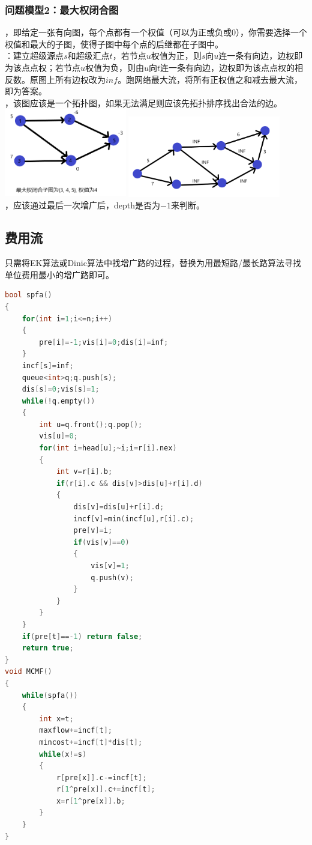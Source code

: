 \documentclass[a4paper]{book}
\begin{document}
\subsubsection{问题模型2：最大权闭合图}
，即给定一张有向图，每个点都有一个权值（可以为正或负或$0$），你需要选择一个权值和最大的子图，使得子图中每个点的后继都在子图中。\\
：建立超级源点$s$和超级汇点$t$，若节点$u$权值为正，则$s$向$u$连一条有向边，边权即为该点点权；若节点$u$权值为负，则由$u$向$t$连一条有向边，边权即为该点点权的相反数。原图上所有边权改为$inf$。跑网络最大流，将所有正权值之和减去最大流，即为答案。\\
，该图应该是一个拓扑图，如果无法满足则应该先拓扑排序找出合法的边。\\
\includegraphics[width=0.4\textwidth,center]{../photo/zxg1}
\includegraphics[width=0.5\textwidth,center]{../photo/zxg2}\\
，应该通过最后一次增广后，depth是否为$-1$来判断。
\subsection{费用流}
只需将EK算法或Dinic算法中找增广路的过程，替换为用最短路/最长路算法寻找单位费用最小的增广路即可。
\begin{lstlisting}[language=c++,title=最小费用最大流]
bool spfa()
{
    for(int i=1;i<=n;i++)
    {
        pre[i]=-1;vis[i]=0;dis[i]=inf;
    }
    incf[s]=inf;
    queue<int>q;q.push(s);
    dis[s]=0;vis[s]=1;
    while(!q.empty())
    {
        int u=q.front();q.pop();
        vis[u]=0;
        for(int i=head[u];~i;i=r[i].nex)
        {
            int v=r[i].b;
            if(r[i].c && dis[v]>dis[u]+r[i].d)
            {
                dis[v]=dis[u]+r[i].d;
                incf[v]=min(incf[u],r[i].c);
                pre[v]=i;
                if(vis[v]==0)
                {
                    vis[v]=1;
                    q.push(v);
                }
            }
        }
    }
    if(pre[t]==-1) return false;
    return true;
}
void MCMF()
{
    while(spfa())
    {
        int x=t;
        maxflow+=incf[t];
        mincost+=incf[t]*dis[t];
        while(x!=s)
        {
            r[pre[x]].c-=incf[t];
            r[1^pre[x]].c+=incf[t];
            x=r[1^pre[x]].b;
        }
    }
}
\end{lstlisting}
\end{document}
